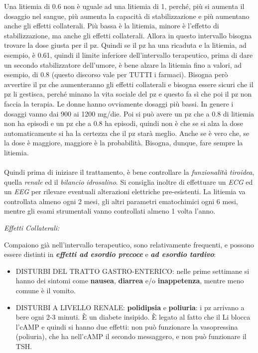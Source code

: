 \begin{itemize}
Una litiemia di 0.6 non è uguale ad una litiemia di 1, perché, più si
aumenta il dosaggio nel sangue, più aumenta la capacità di
stabilizzazione e più aumentano anche gli effetti collaterali. Più bassa
è la litiemia, minore è l'effetto di stabilizzazione, ma anche gli
effetti collaterali. Allora in questo intervallo bisogna trovare la dose
giusta per il pz. Quindi se il pz ha una ricaduta e la litiemia, ad
esempio, è 0.61, quindi il limite inferiore dell'intervallo terapeutico,
prima di dare un secondo stabilizzatore dell'umore, è bene alzare la
litiemia fino a valori, ad esempio, di 0.8 (questo discorso vale per
TUTTI i farmaci). Bisogna però avvertire il pz che aumenteranno gli
effetti collaterali e bisogna essere sicuri che il pz li gestisca,
perché minano la vita sociale del pz e questo fa sì che poi il pz non
faccia la terapia. Le donne hanno ovviamente dosaggi più bassi. In
genere i dosaggi vanno dai 900 ai 1200 mg/die. Poi si può avere un pz
che a 0.8 di litiemia non ha episodi e un pz che a 0.8 ha episodi,
quindi non è che se si alza la dose automaticamente si ha la certezza
che il pz starà meglio. Anche se è vero che, se la dose è maggiore,
maggiore è la probabilità. Bisogna, dunque, fare sempre la litiemia.
\\\\
Quindi prima di iniziare il trattamento, è bene controllare la
\emph{funzionalità tiroidea}, quella \emph{renale} ed il \emph{bilancio}
\emph{idrosalino}. Si consiglia inoltre di effettuare un \emph{ECG} ed
un \emph{EEG} per rilevare eventuali alterazioni elettriche
pre-esistenti. La litiemia va controllata almeno ogni 2 mesi, gli altri
parametri ematochimici ogni 6 mesi, mentre gli esami strumentali vanno
controllati almeno 1 volta l'anno.

\emph{\emph{Effetti Collaterali:}}

Compaiono già nell'intervallo terapeutico, sono relativamente frequenti,
e possono essere distinti in \textbf{\emph{effetti ad esordio precoce}}
e \textbf{\emph{ad esordio tardivo}}:

\begin{itemize}
\item
  DISTURBI DEL TRATTO GASTRO-ENTERICO: nelle prime settimane si hanno
  dei sintomi come \textbf{nausea}, \textbf{diarrea} e/o
  \textbf{inappetenza}, mentre meno comune è il vomito.
\item
  DISTURBI A LIVELLO RENALE: \textbf{polidipsia} e \textbf{poliuria}: i
  pz arrivano a bere ogni 2-3 minuti. È un diabete insipido. È legato al
  fatto che il Li blocca l'cAMP e quindi si hanno due effetti: non può
  funzionare la vasopressina (poliuria), che ha nell'cAMP il secondo
  messaggero, e non può funzionare il TSH.


\end{itemize}
\end{itemize}
